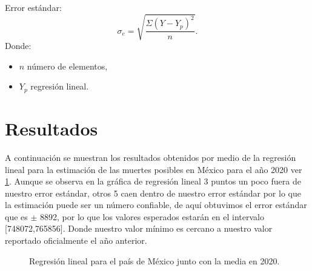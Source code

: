 \documentclass[12pt]{article}
\begin{document}
Error estándar:
\[ \sigma_{e} = \sqrt{\frac{\Sigma (Y - Y_{p})^{2}}{n}} .\]
Donde:
\begin{itemize}
	\item $n$ número de elementos,
	\item $Y_{p}$ regresión lineal.
\end{itemize}

\section{Resultados}
A continuación se muestran los resultados obtenidos por medio de la regresión lineal para la estimación de las muertes posibles en México para el año 2020 ver \ref{fig:RegresionMexico}.
Aunque se observa en la gráfica de regresión lineal 3 puntos un poco fuera de nuestro error estándar, otros 5 caen dentro de nuestro error estándar por lo que la estimación puede ser un número confiable, de aquí obtuvimos el error estándar que es $\pm$ 8892, por lo que los valores esperados estarán en el intervalo [748072,765856].
Donde nuestro valor mínimo es cercano a nuestro valor reportado oficialmente el año anterior.

\begin{figure}[H]
\centering
{}%
\hfill
{}%
\hfill
\caption{Regresión lineal para el país de México junto con la media en 2020.}

\label{fig:RegresionMexico}
\end{figure}   
\hfill
\end{document}
